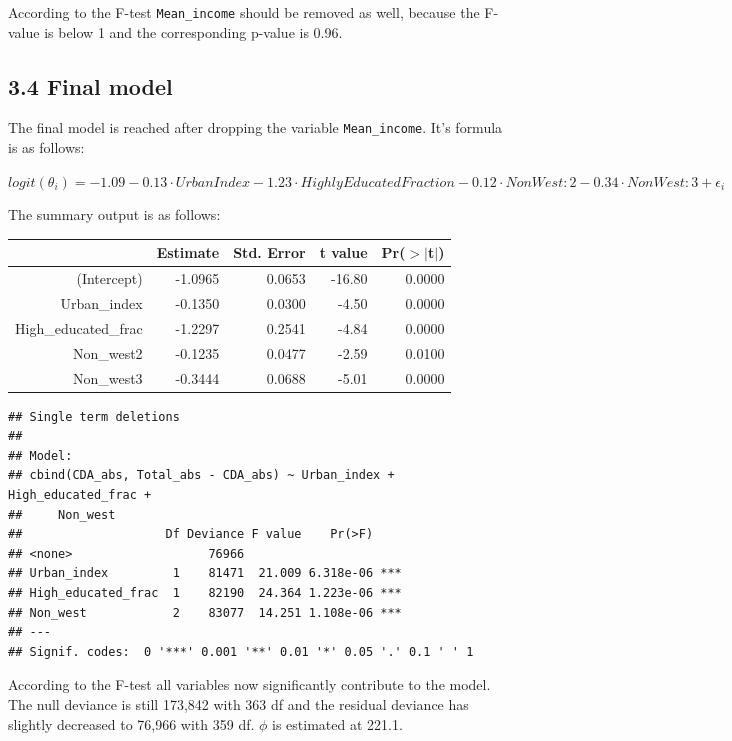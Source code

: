 \documentclass[11pt,]{article}
\begin{document}
According to the F-test \texttt{Mean\_income} should be removed as well,
because the F-value is below 1 and the corresponding p-value is 0.96.

\subsection{3.4 Final model}\label{final-model-1}

The final model is reached after dropping the variable
\texttt{Mean\_income}. It's formula is as follows:

\(logit(\theta_{i}) = -1.09 -0.13 \cdot UrbanIndex -1.23 \cdot HighlyEducatedFraction - 0.12 \cdot NonWest:2 - 0.34 \cdot NonWest:3 + \epsilon_i\)

The summary output is as follows:

\begin{table}[ht]
\centering
\begin{tabular}{rrrrr}
  \hline
 & Estimate & Std. Error & t value & Pr($>$$|$t$|$) \\ 
  \hline
(Intercept) & -1.0965 & 0.0653 & -16.80 & 0.0000 \\ 
  Urban\_index & -0.1350 & 0.0300 & -4.50 & 0.0000 \\ 
  High\_educated\_frac & -1.2297 & 0.2541 & -4.84 & 0.0000 \\ 
  Non\_west2 & -0.1235 & 0.0477 & -2.59 & 0.0100 \\ 
  Non\_west3 & -0.3444 & 0.0688 & -5.01 & 0.0000 \\ 
   \hline
\end{tabular}
\end{table}

\begin{verbatim}
## Single term deletions
## 
## Model:
## cbind(CDA_abs, Total_abs - CDA_abs) ~ Urban_index + High_educated_frac + 
##     Non_west
##                    Df Deviance F value    Pr(>F)    
## <none>                   76966                      
## Urban_index         1    81471  21.009 6.318e-06 ***
## High_educated_frac  1    82190  24.364 1.223e-06 ***
## Non_west            2    83077  14.251 1.108e-06 ***
## ---
## Signif. codes:  0 '***' 0.001 '**' 0.01 '*' 0.05 '.' 0.1 ' ' 1
\end{verbatim}

According to the F-test all variables now significantly contribute to
the model. The null deviance is still 173,842 with 363 df and the
residual deviance has slightly decreased to 76,966 with 359 df. \(\phi\)
is estimated at 221.1.
\end{document}
